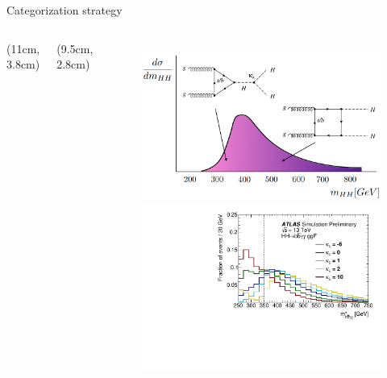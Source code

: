 \begin{frame}{Categorization strategy}
\begin{columns}
\begin{textblock*}{5cm}(11cm, 3.8cm) %
\end{textblock*}
\begin{textblock*}{5cm}(9.5cm, 2.8cm) %
\end{textblock*}
\begin{figure}
    \begin{overprint}
    \centering\centering\includegraphics[width=1\textwidth]{Part3/Img/mHH_diagram2.png}
    \centering\includegraphics[width=1.1\textwidth]{Part3/Img/mbbyy_star_ggF.pdf}
    \end{overprint}
\end{figure}
\end{columns}
\end{frame}

